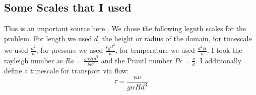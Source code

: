 \documentclass{article}
\begin{document}
\subsection*{Some Scales that I used}
This is an important source here \cite{goluskin2016internally}.
\newline
We chose the following legnth scales for the problem. For length we used $d$, the height or radius of the domain, 
for timescale we used $\frac{d^2}{\kappa}$, for pressure we used $\frac{\rho_0 d^2}{\kappa}$, for temperature we used $\frac{d^2 H}{\kappa}$. 
I took the rayleigh number as $Ra = \frac{g \alpha H d^5}{\nu \kappa^2}$ and the Prantl number $Pr = \frac{\nu}{\kappa}$. I additionally define a timescale for transport via flow:
\begin{equation}
	\tau = \frac{\kappa \nu}{g \alpha H d^3}
\end{equation}






\end{document}
